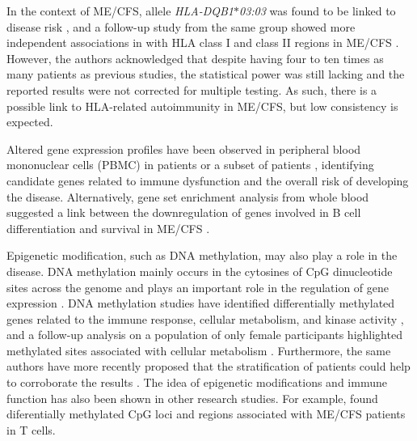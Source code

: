 In the context of ME/CFS, allele \textit{HLA-DQB1${\ast}$03:03} was found to be linked to disease risk \citep{lande2020HumanLeukocyte}, and a follow-up study from the same group showed more independent associations in with HLA class I and class II regions in ME/CFS \citep{hajdarevic2021FineMapping}.
However, the authors acknowledged that despite having four to ten times as many patients as previous studies, the statistical power was still lacking and the reported results were not corrected for multiple testing.
As such, there is a possible link to HLA-related autoimmunity in ME/CFS, but low consistency is expected.


Altered gene expression profiles have been observed in peripheral blood mononuclear cells (PBMC) in patients \citep{vernon2002UtilityBlood} or a subset of patients \citep{kaiser2006GenesChronic, kerrGeneProfilingPatients2008, zhang2010MicrobialInfections}, identifying candidate genes related to immune dysfunction and the overall risk of developing the disease.
Alternatively, gene set enrichment analysis from whole blood suggested a link between the downregulation of genes involved in B cell differentiation and survival in ME/CFS \citep{nguyen2017WholeBlood}.


Epigenetic modification, such as DNA methylation, may also play a role in the disease.
DNA methylation mainly occurs in the cytosines of CpG dinucleotide sites across the genome and plays an important role in the regulation of gene expression \citep{trivedi2018IdentificationMyalgic}.
DNA methylation studies have identified differentially methylated genes related to the immune response, cellular metabolism, and kinase activity \citep{vegaDNAMethylationModifications2014}, and a follow-up analysis on a population of only female participants highlighted methylated sites associated with cellular metabolism \citep{vegaEpigeneticModificationsGlucocorticoid2017}.
Furthermore, the same authors have more recently proposed that the stratification of patients could help to corroborate the results \citep{vegaIntegrationDNAMethylation2018}.
The idea of epigenetic modifications and immune function has also been shown in other research studies.
For example, \citet{herrera2018GenomeepigenomeInteractions} found diferentially methylated CpG loci and regions associated with ME/CFS patients in T cells.

